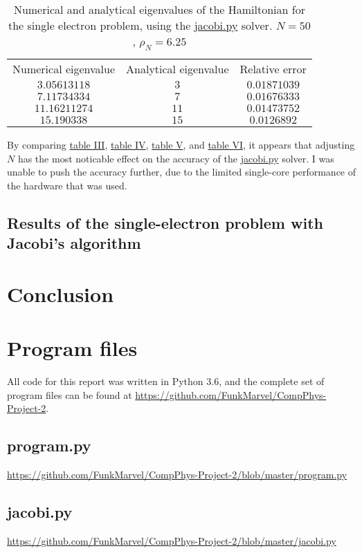 \documentclass[english,notitlepage,reprint]{revtex4-1}  %
\begin{document}
\begin{table}[H]
	\label{tab:434}
	\centering
	\begin{tabular}{|c|c|c|}
	Numerical eigenvalue & Analytical eigenvalue & Relative error \\
	\(3.05613118\)	& \(3\) & \(0.01871039\) \\
	\(7.11734334\) & \(7\) & \(0.01676333\) \\
	\(11.16211274\) & \(11\) & \(0.01473752\) \\
	\(15.190338\) & \(15\) & \(0.0126892\) \\
	\end{tabular}
	\caption{Numerical and analytical eigenvalues of the Hamiltonian for
	the single electron problem, using the \hyperref[A:2]{jacobi.py} solver. \(N=50\),
	\(\rho_{N}=6.25\)}
\end{table}
By comparing \hyperref[tab:431]{table III}, \hyperref[tab:432]{table IV}, \hyperref[tab:433]{table V}, and \hyperref[tab:434]{table VI}, it appears that adjusting \(N\) has the most noticable effect on the accuracy of the \hyperref[A:2]{jacobi.py} solver. I was unable to push the accuracy further, due to the limited single-core performance of the hardware that was used.

\subsection{Results of the single-electron problem with Jacobi's algorithm}\label{subsec:44}


\section{Conclusion}\label{sec:5}

{}
\newpage
\appendix
\section{Program files} \label{A}
All code for this report was written in Python 3.6, and the complete set of program files can be found at \url{https://github.com/FunkMarvel/CompPhys-Project-2}.

\subsection{program.py}\label{A:1}
\url{https://github.com/FunkMarvel/CompPhys-Project-2/blob/master/program.py}

\subsection{jacobi.py}\label{A:2}
\url{https://github.com/FunkMarvel/CompPhys-Project-2/blob/master/jacobi.py}
\end{document}
